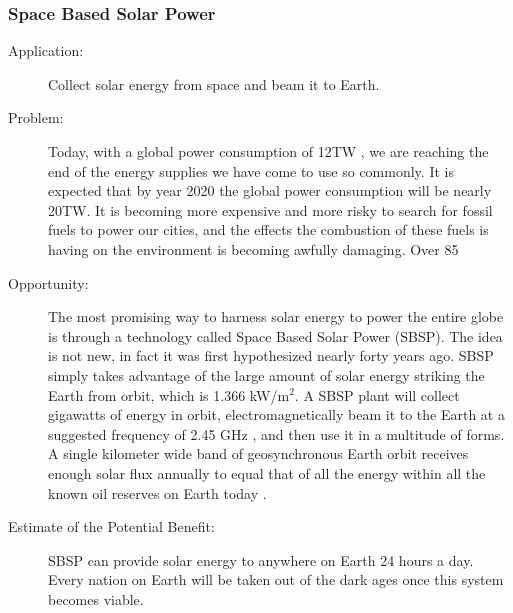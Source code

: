\subsubsection{Space Based Solar Power}
\label{sbsp}
\begin{description}  \item[Application:] Collect solar energy from space and beam it to  Earth.
 
\item[Problem:] Today, with a  global power consumption of 12TW \cite{Seboldt2004}, we are reaching the end of the  energy supplies we have come to use so commonly. It is expected that by  year 2020 the global power consumption will be nearly 20TW. It is  becoming more expensive and more risky to search for fossil fuels to  power our cities, and the effects the combustion of these fuels is  having on the environment is becoming awfully damaging. Over 85%


 
\item[Opportunity:] The most  promising way to harness solar energy to power the entire globe is  through a technology called Space Based Solar Power (SBSP). The idea is  not new, in fact it was first hypothesized nearly forty years ago. SBSP  simply takes advantage of the large amount of solar energy striking the  Earth from orbit, which is 1.366 kW/m$^2$. A SBSP plant will collect  gigawatts of energy in orbit, electromagnetically beam it to the Earth  at a suggested frequency of 2.45 GHz \cite{Chaudhary2010}, and then use it in a multitude  of forms. A single kilometer wide band of geosynchronous Earth orbit  receives enough solar flux annually to equal that of all the energy  within all the known oil reserves on Earth today \cite{NationalSpaceSociety2007}.
 
\item[Estimate of the Potential  Benefit:] SBSP can provide solar energy to anywhere on Earth 24 hours a  day. Every nation on Earth will be taken out of the dark ages once this  system becomes viable.
 

\end{description}
